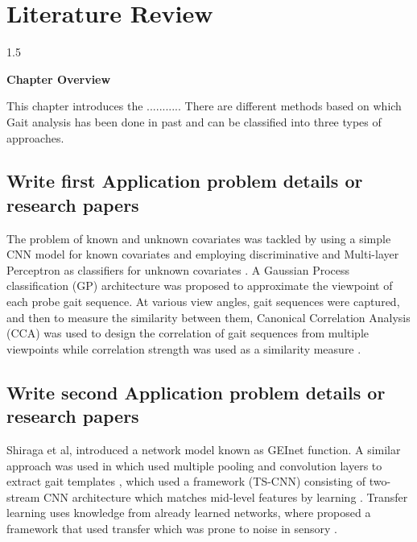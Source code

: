 \documentclass[A4paper,12pt]{report}
\theoremstyle{plain}
\theoremstyle{definition}
\theoremstyle{remark}
\numberwithin{equation}{section}
\begin{document}
\chapter{Literature Review}
\thispagestyle{empty}
\newpage
\begin{spacing}{1.5}

\thispagestyle{empty}

{\centering \Large \bfseries Chapter Overview \par}
\vspace{1cm} %

This chapter introduces the ...........
There are different methods based on which Gait analysis has been done in past and can be classified into three types of approaches.

\end{spacing}


\section{Write first Application problem details or research papers}

The problem of known and unknown covariates was tackled by using a simple CNN model for known covariates and employing discriminative and Multi-layer Perceptron as classifiers for unknown covariates \cite{4}. A Gaussian Process classification (GP) architecture was proposed to approximate the viewpoint of each probe gait sequence. At various view angles, gait sequences were captured, and then to measure the similarity between them, Canonical Correlation Analysis (CCA) was used to design the correlation of gait sequences from multiple viewpoints while correlation strength was used as a similarity measure \cite{5}. 

\section{Write second Application problem details or research papers}

Shiraga et al, \cite{11} introduced a network model known as GEInet function. A similar approach was used in \cite{12} which used multiple pooling and convolution layers to extract gait templates \cite{13}, which used a framework (TS-CNN) consisting of two-stream CNN architecture which matches mid-level features by learning \cite{14}. Transfer learning uses knowledge from already learned networks, where \cite{15} proposed a framework that used transfer  \cite{16} which was prone to noise in sensory .
\end{document}
